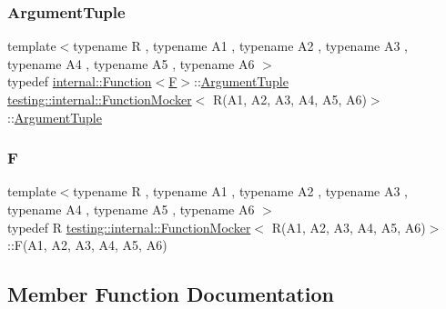 \subsubsection{\texorpdfstring{ArgumentTuple}{ArgumentTuple}}
{\footnotesize\ttfamily template$<$typename R , typename A1 , typename A2 , typename A3 , typename A4 , typename A5 , typename A6 $>$ \\
typedef \mbox{\hyperlink{structtesting_1_1internal_1_1Function}{internal\+::\+Function}}$<$\mbox{\hyperlink{classtesting_1_1internal_1_1FunctionMocker_3_01R_07A1_00_01A2_00_01A3_00_01A4_00_01A5_00_01A6_08_4_a5373cd66051f0a54e83b0497004df058}{F}}$>$\+::\mbox{\hyperlink{classtesting_1_1internal_1_1FunctionMocker_3_01R_07A1_00_01A2_00_01A3_00_01A4_00_01A5_00_01A6_08_4_a0c8bc671adc8e67e8a49a01432407139}{Argument\+Tuple}} \mbox{\hyperlink{classtesting_1_1internal_1_1FunctionMocker}{testing\+::internal\+::\+Function\+Mocker}}$<$ R(A1, A2, A3, A4, A5, A6)$>$\+::\mbox{\hyperlink{classtesting_1_1internal_1_1FunctionMocker_3_01R_07A1_00_01A2_00_01A3_00_01A4_00_01A5_00_01A6_08_4_a0c8bc671adc8e67e8a49a01432407139}{Argument\+Tuple}}}

\mbox{\label{classtesting_1_1internal_1_1FunctionMocker_3_01R_07A1_00_01A2_00_01A3_00_01A4_00_01A5_00_01A6_08_4_a5373cd66051f0a54e83b0497004df058}} 
\subsubsection{\texorpdfstring{F}{F}}
{\footnotesize\ttfamily template$<$typename R , typename A1 , typename A2 , typename A3 , typename A4 , typename A5 , typename A6 $>$ \\
typedef R \mbox{\hyperlink{classtesting_1_1internal_1_1FunctionMocker}{testing\+::internal\+::\+Function\+Mocker}}$<$ R(A1, A2, A3, A4, A5, A6)$>$\+::F(A1, A2, A3, A4, A5, A6)}



\subsection{Member Function Documentation}
\mbox{\label{classtesting_1_1internal_1_1FunctionMocker_3_01R_07A1_00_01A2_00_01A3_00_01A4_00_01A5_00_01A6_08_4_a8499277f15101fefacbb0c9d93b8153b}} 
